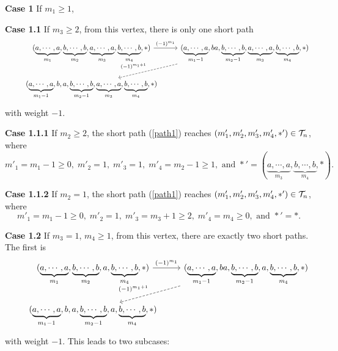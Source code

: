 \documentclass[10pt, reqno]{amsart}
\theoremstyle{definition}
\theoremstyle{remark}
\numberwithin{equation}{section}
\begin{document}
\noindent \textbf{Case 1} If \(m_1 \ge 1\),

\noindent \hspace*{2em}\textbf{Case 1.1} If \(m_3 \ge 2\), from this vertex, there is only one short path
\begin{equation} \label{path1}
    \begin{tikzcd}
   & (\underbrace{a, \cdots,a}_{m_1}, \underbrace{b, \cdots,b}_{m_2}, \underbrace{a, \cdots,a}_{m_3}, \underbrace{b, \cdots,b}_{m_4},*) \arrow[r,"(-1)^{m_1}"] & (\underbrace{a, \cdots,a}_{m_1-1}, ba, \underbrace{b, \cdots,b}_{m_2-1}, \underbrace{a, \cdots,a}_{m_3}, \underbrace{b, \cdots,b}_{m_4},*) \arrow[ld,dashed,"(-1)^{m_1+1}",swap] \\
   & (\underbrace{a, \cdots,a}_{m_1-1}, b, a, \underbrace{b, \cdots,b}_{m_2-1}, \underbrace{a, \cdots,a}_{m_3}, \underbrace{b, \cdots,b}_{m_4},*)
        \end{tikzcd}
\end{equation}
 with weight $-1$.
 
\noindent \hspace*{4em}\textbf{Case 1.1.1} If \(m_2 \ge 2\), the short path (\ref{path1}) reaches \((m'_1, m'_2, m'_3, m'_4, *') \in \mathcal{T}_n\), where 
\begin{equation}
    m'_1= m_1-1 \ge 0,\;  m'_2= 1,\;  m'_3=1,\;  m'_4 =m_2-1\ge 1, \text{ and } *' = (\underbrace{a, \cdots,a}_{m_3}, \underbrace{b, \cdots,b}_{m_4},*).
\end{equation}

\noindent \hspace*{4em}\textbf{Case 1.1.2} If \(m_2=1\), the short path (\ref{path1}) reaches \((m'_1, m'_2, m'_3, m'_4, *')\in \mathcal{T}_n\), where
\begin{equation}
    m'_1= m_1-1 \ge 0,\;  m'_2= 1,\;  m'_3=m_3+1\ge 2,\;  m'_4 =m_4\ge 0, \text{ and } *'=*.
\end{equation}

\noindent \hspace*{2em}\textbf{Case 1.2} If \(m_3=1\), \( m_4 \ge 1\), from this vertex, there are exactly two short paths. The first is  
\begin{equation} \label{path2}
    \begin{tikzcd}
   & (\underbrace{a, \cdots,a}_{m_1}, \underbrace{b, \cdots,b}_{m_2}, a, \underbrace{b, \cdots,b}_{m_4},*) \arrow[r,"(-1)^{m_1}"] & (\underbrace{a, \cdots,a}_{m_1-1}, ba, \underbrace{b, \cdots,b}_{m_2-1}, a, \underbrace{b, \cdots,b}_{m_4},*) \arrow[ld,dashed,"(-1)^{m_1+1}",swap] \\
   & (\underbrace{a, \cdots,a}_{m_1-1}, b, a, \underbrace{b, \cdots,b}_{m_2-1}, a, \underbrace{b, \cdots,b}_{m_4},*)
        \end{tikzcd}
\end{equation}
with weight $-1$. This leads to two subcases:
\end{document}
